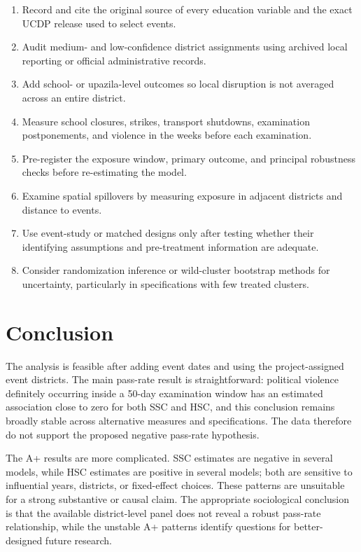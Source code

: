 \documentclass[11pt]{article}
\begin{document}
\begin{enumerate}
  \item Record and cite the original source of every education variable and the exact UCDP release used to select events.
  \item Audit medium- and low-confidence district assignments using archived local reporting or official administrative records.
  \item Add school- or upazila-level outcomes so local disruption is not averaged across an entire district.
  \item Measure school closures, strikes, transport shutdowns, examination postponements, and violence in the weeks before each examination.
  \item Pre-register the exposure window, primary outcome, and principal robustness checks before re-estimating the model.
  \item Examine spatial spillovers by measuring exposure in adjacent districts and distance to events.
  \item Use event-study or matched designs only after testing whether their identifying assumptions and pre-treatment information are adequate.
  \item Consider randomization inference or wild-cluster bootstrap methods for uncertainty, particularly in specifications with few treated clusters.
\end{enumerate}

\section{Conclusion}

The analysis is feasible after adding event dates and using the project-assigned event districts. The main pass-rate result is straightforward: political violence definitely occurring inside a 50-day examination window has an estimated association close to zero for both SSC and HSC, and this conclusion remains broadly stable across alternative measures and specifications. The data therefore do not support the proposed negative pass-rate hypothesis.

The A+ results are more complicated. SSC estimates are negative in several models, while HSC estimates are positive in several models; both are sensitive to influential years, districts, or fixed-effect choices. These patterns are unsuitable for a strong substantive or causal claim. The appropriate sociological conclusion is that the available district-level panel does not reveal a robust pass-rate relationship, while the unstable A+ patterns identify questions for better-designed future research.
\end{document}
